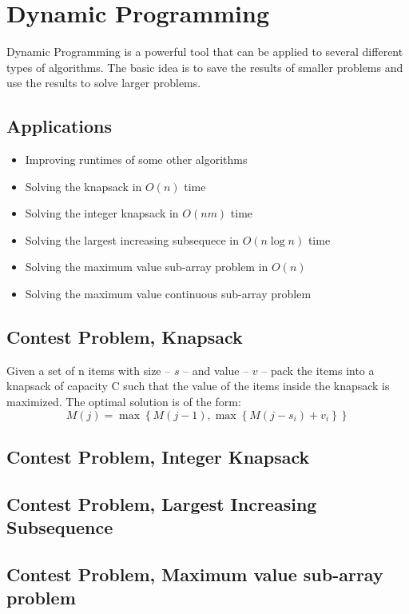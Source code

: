 \section{Dynamic Programming}
Dynamic Programming is a powerful tool that can be applied to several different types of algorithms.\cite{dppractice}
The basic idea is to save the results of smaller problems and use the results to solve larger problems.

\subsection{Applications}
\begin{itemize}
	\item	Improving runtimes of some other algorithms
	\item	Solving the knapsack in $O(n)$ time
	\item	Solving the integer knapsack in $O(nm)$ time
	\item	Solving the largest increasing subsequece in $O(n \log n)$ time
	\item	Solving the maximum value sub-array problem in $O(n)$
	\item	Solving the maximum value continuous sub-array problem
\end{itemize}

\subsection{Contest Problem, Knapsack}
Given a set of n items with size -- $s$ -- and value -- $v$ -- pack the items into a knapsack of capacity C such that the value of the items inside the knapsack is maximized.  The optimal solution is of the form:
$$M(j) = \max \left\{M(j-1), \max \left\{M(j - s_i) + v_i \right\}\right\}$$


\subsection{Contest Problem, Integer Knapsack}
\subsection{Contest Problem, Largest Increasing Subsequence}
\subsection{Contest Problem, Maximum value sub-array problem}
